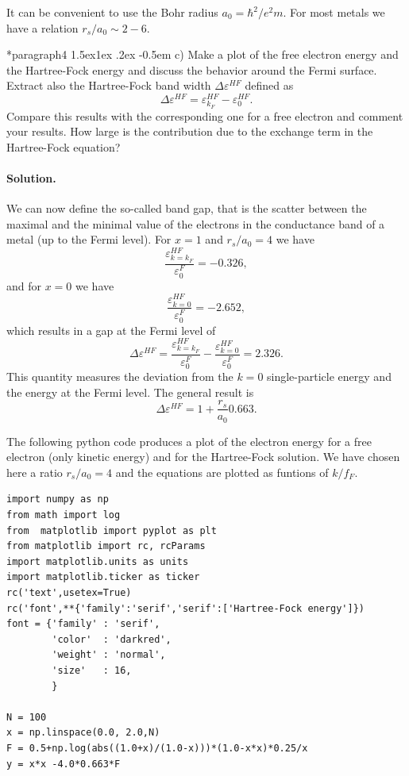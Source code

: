 \documentclass[%
oneside,                 %
final,                   %
10pt]{article}
\makeatletter
\newenvironment{doconceexercise}{}{}
\newcommand\subex{\@startsection*{paragraph}{4}{\z@}%
                  {1.5ex\@plus1ex \@minus.2ex}%
                  {-0.5em}%
                  {\normalfont\normalsize\bfseries}}
\makeatother
\begin{document}
\begin{doconceexercise}

It can be convenient to use the Bohr radius $a_0=\hbar^2/e^2m$.
For most metals we have a relation $r_s/a_0\sim 2-6$.

\subex{c)}
Make a plot of the free electron energy and the Hartree-Fock energy and discuss the behavior around the Fermi surface. Extract also   the Hartree-Fock band width $\Delta\varepsilon^{HF}$ defined as
\[ 
\Delta\varepsilon^{HF}=\varepsilon_{k_{F}}^{HF}-
\varepsilon_{0}^{HF}.
\]
Compare this results with the corresponding one for a free electron and comment your results. How large is the contribution due to the exchange term in the Hartree-Fock equation?


\paragraph{Solution.}
We can now define the so-called band gap, that is the scatter between the maximal and the minimal value of the electrons in the conductance band of a metal (up to the Fermi level). 
For $x=1$ and $r_s/a_0=4$ we have 
\[
\frac{\varepsilon_{k=k_F}^{HF} }{\varepsilon_{0}^{F}} = -0.326,
\]
and for $x=0$ we have
\[
\frac{\varepsilon_{k=0}^{HF} }{\varepsilon_{0}^{F}} = -2.652,
\]
which results in a gap at the Fermi level of 
\[
\Delta \varepsilon^{HF} = \frac{\varepsilon_{k=k_F}^{HF} }{\varepsilon_{0}^{F}}-\frac{\varepsilon_{k=0}^{HF} }{\varepsilon_{0}^{F}} = 2.326.
\]
This quantity measures the deviation from the $k=0$ single-particle energy and the energy at the Fermi level.
The general result is 
\[
\Delta \varepsilon^{HF} = 1+\frac{r_s}{a_0}0.663.
\]

The following python code produces a plot of the electron energy for a free electron (only kinetic energy) and 
for the Hartree-Fock solution. We have chosen here a ratio $r_s/a_0=4$ and the equations are plotted as funtions
of $k/f_F$. 
\begin{verbatim}
import numpy as np
from math import log
from  matplotlib import pyplot as plt
from matplotlib import rc, rcParams
import matplotlib.units as units
import matplotlib.ticker as ticker
rc('text',usetex=True)
rc('font',**{'family':'serif','serif':['Hartree-Fock energy']})
font = {'family' : 'serif',
        'color'  : 'darkred',
        'weight' : 'normal',
        'size'   : 16,
        }

N = 100
x = np.linspace(0.0, 2.0,N)
F = 0.5+np.log(abs((1.0+x)/(1.0-x)))*(1.0-x*x)*0.25/x
y = x*x -4.0*0.663*F


\end{verbatim}
\end{doconceexercise}
\end{document}
